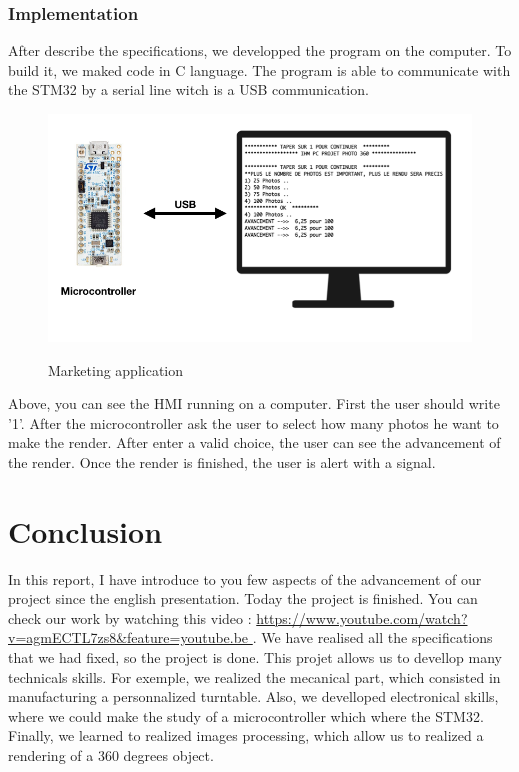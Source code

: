   \subsubsection {Implementation } 

After describe the specifications, we developped the program on the computer. To build it,  we maked code in C language. The program is able to communicate with the STM32 by a serial line witch is a USB communication. 
\newpage

\begin{figure}[h]
    \centering
    \includegraphics[scale=0.4]{img/IHM_PC.png}\\%
    \caption{Marketing application}
    \label{fig:LogoTachyssema}
  \end{figure}

  Above, you can see the HMI running on a computer. First the user should write '1'. After the microcontroller ask the user to select how many photos he want to make the render. After enter a valid choice, the user can see the advancement of the render. Once the render is finished, the user is alert with a signal. 

\section {Conclusion } 

In this report, I have introduce to you few aspects of the advancement of our project since the english presentation. Today the project is finished. You can check our work by watching this video : \url{https://www.youtube.com/watch?v=agmECTL7zs8&feature=youtube.be }. 
We have realised all the specifications that we had fixed, so the project is done. 
This projet allows us to devellop many technicals skills. For exemple, we realized the mecanical part, which consisted in manufacturing a personnalized turntable. Also, we develloped electronical skills, where we could make the study of a microcontroller which where the STM32. 
Finally, we learned to realized images processing, which allow us to realized a rendering of a 360 degrees object.

